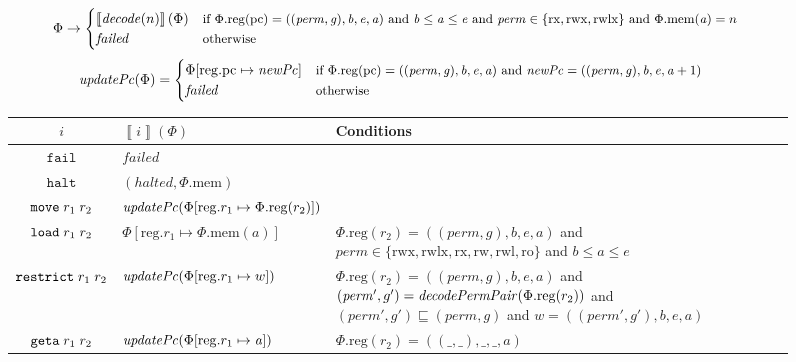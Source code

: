 \documentclass[compsoc,conference,letterpaper,fleqn]{IEEEtran}
\newcommand{\update}[2]{[#1 \mapsto #2]}
\newcommand{\sem}[1]{\left\llbracket #1 \right\rrbracket}
\newcommand{\var}[1]{\mathit{#1}}
\newcommand{\gl}{\var{g}}
\newcommand{\pcreg}{\mathrm{pc}}
\newcommand{\addr}{\var{a}}
\newcommand{\start}{\var{b}}
\newcommand{\addrend}{\var{e}}
\newcommand{\perm}{\var{perm}}
\newcommand{\stdcap}[1][(\perm,\gl)]{\left(#1,\start,\addrend,\addr \right)}
\newcommand{\plainproj}[1]{\mathrm{#1}}
\newcommand{\memheap}[1][\Phi]{#1.\plainproj{mem}}
\newcommand{\memreg}[1][\Phi]{#1.\plainproj{reg}}
\newcommand{\updateReg}[3][\Phi]{#1\update{\plainproj{reg}.#2}{#3}}
\newcommand{\failed}{\mathit{failed}}
\newcommand{\halted}{\mathit{halted}}
\newcommand{\plainfun}[2]{
  \ifthenelse{\equal{#2}{}}
  {\mathit{#1}}
  {\mathit{#1}(#2)}
}
\newcommand{\decode}{\plainfun{decode}{}}
\newcommand{\decodePermPair}{\plainfun{decodePermPair}}
\newcommand{\stdUpdatePc}[1]{\plainfun{updatePc}{#1}}
\newcommand{\refreg}[1]{#1}
\newcommand{\refheap}[1]{#1}
\newcommand{\zinstr}[1]{\mathtt{#1}}
\newcommand{\fail}{\zinstr{fail}}
\newcommand{\halt}{\zinstr{halt}}
\newcommand{\twoinstr}[3]{
  \ifthenelse{\equal{#2#3}{}}
  {\zinstr{#1}}
  {\zinstr{#1} \; #2 \; #3}
}
\newcommand{\restricttwo}[2]{\twoinstr{restrict}{#1}{#2}}
\newcommand{\geta}[2]{\twoinstr{geta}{#1}{#2}}
\newcommand{\move}[2]{\twoinstr{move}{#1}{#2}}
\newcommand{\load}[2]{\twoinstr{load}{#1}{#2}}
\newcommand{\plainperm}[1]{\mathrm{#1}}
\newcommand{\readonly}{\plainperm{ro}}
\newcommand{\readwrite}{\plainperm{rw}}
\newcommand{\exec}{\plainperm{rx}}
\newcommand{\rwx}{\plainperm{rwx}}
\newcommand{\readwritel}{\plainperm{rwl}}
\newcommand{\rwlx}{\plainperm{rwlx}}
\begin{document}
\begin{figure}
  \centering
  \begin{equation*}
    \Phi  \rightarrow
    \begin{cases}
      \sem{\decode(n)}(\Phi) & \text{\footnotesize{if $\memreg(\pcreg) = \stdcap$ and $\start \leq \addr \leq \addrend$ and $\perm \in \{ \exec,\rwx, \rwlx \}$ and $\memheap(\addr) = n$ }}\\
      \failed                                 & \text{\footnotesize{otherwise}}
    \end{cases}
  \end{equation*}\vspace{-.3cm}%
  \begin{align*}
    \stdUpdatePc{\Phi} &=
                         \begin{cases}
                           \updateReg{\pcreg}{\var{newPc}} & \arraycolsep=0pt
                             \text{\footnotesize{if $\memreg(\pcreg) = \stdcap$ and $\var{newPc} = ((\perm,\gl),\start,\addrend,\addr + 1)$}}\\
                             \failed & \text{\footnotesize{otherwise}}
                         \end{cases}
  \end{align*}
  \begin{tabular}{|c|p{4.3cm}|p{9.9cm}|}
    \hline
    $i$&$\sem{i}(\Phi)$&Conditions\\
    \hline 
    $\fail$&$\failed$&\\
    \hline
    $\halt$&$(\halted,\memheap)$&\\
    \hline
    $\move{\refreg{r_1}}{r_2}$& $\stdUpdatePc{}(\updateReg{r_1}{\memreg(r_2)})$&\\
    \hline
    $\load{\refreg{r_1}}{\refheap{r_2}}$&$\updateReg{r_1}{\memheap(\addr)}$&$\memreg(r_2) = \stdcap$\footnotesize{ and }$\perm \in \{ \rwx, \rwlx, \exec, \readwrite, \readwritel, \readonly \}$\footnotesize{ and }$\start \leq \addr \leq \addrend$\\
    \hline
    $\restricttwo{\refreg{r_1}}{r_2}$&$\stdUpdatePc{}(\updateReg{r_1}{w})$  & $\memreg(r_2) = \stdcap$\footnotesize{ and }$(\perm',g') = \decodePermPair{\memreg(r_2)}$
                                                      \footnotesize{ and }$(\perm',g') \sqsubseteq (\perm,g)$\footnotesize{ and } $w =((\perm',g'),\start,\addrend,\addr)$\\
    \hline
    $\geta{\refreg{r_1}}{\refreg{r_2}}$ & $\stdUpdatePc{\updateReg{r_1}{\addr}}$ &
                                                $\memreg(r_2) = ((\_,\_),\_,\_,\addr)$\\

\end{tabular}
\end{figure}
\end{document}
